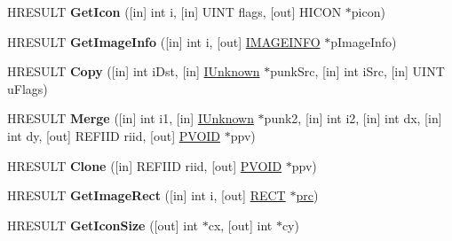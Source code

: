 \begin{DoxyCompactItemize}
\mbox{\label{interface_i_image_list_a5e71f99ba76698760c5931b771733073}} 
H\+R\+E\+S\+U\+LT {\bfseries Get\+Icon} (\mbox{[}in\mbox{]} int i, \mbox{[}in\mbox{]} U\+I\+NT flags, \mbox{[}out\mbox{]} H\+I\+C\+ON $\ast$picon)
\item 
\mbox{\label{interface_i_image_list_a140bde8c59e83504d3d712fb744539d2}} 
H\+R\+E\+S\+U\+LT {\bfseries Get\+Image\+Info} (\mbox{[}in\mbox{]} int i, \mbox{[}out\mbox{]} \hyperlink{struct_i_m_a_g_e_i_n_f_o}{I\+M\+A\+G\+E\+I\+N\+FO} $\ast$p\+Image\+Info)
\item 
\mbox{\label{interface_i_image_list_acbdf9c1b3f02a2cee373ad7ef3bd0c75}} 
H\+R\+E\+S\+U\+LT {\bfseries Copy} (\mbox{[}in\mbox{]} int i\+Dst, \mbox{[}in\mbox{]} \hyperlink{interface_i_unknown}{I\+Unknown} $\ast$punk\+Src, \mbox{[}in\mbox{]} int i\+Src, \mbox{[}in\mbox{]} U\+I\+NT u\+Flags)
\item 
\mbox{\label{interface_i_image_list_a9d8e77ca586e69487e75e3f8ee9d5eee}} 
H\+R\+E\+S\+U\+LT {\bfseries Merge} (\mbox{[}in\mbox{]} int i1, \mbox{[}in\mbox{]} \hyperlink{interface_i_unknown}{I\+Unknown} $\ast$punk2, \mbox{[}in\mbox{]} int i2, \mbox{[}in\mbox{]} int dx, \mbox{[}in\mbox{]} int dy, \mbox{[}out\mbox{]} R\+E\+F\+I\+ID riid, \mbox{[}out\mbox{]} \hyperlink{interfacevoid}{P\+V\+O\+ID} $\ast$ppv)
\item 
\mbox{\label{interface_i_image_list_a7a1b8b99808b0b64fc86c388019af362}} 
H\+R\+E\+S\+U\+LT {\bfseries Clone} (\mbox{[}in\mbox{]} R\+E\+F\+I\+ID riid, \mbox{[}out\mbox{]} \hyperlink{interfacevoid}{P\+V\+O\+ID} $\ast$ppv)
\item 
\mbox{\label{interface_i_image_list_a800d06a91e479fdc48140711c3414f35}} 
H\+R\+E\+S\+U\+LT {\bfseries Get\+Image\+Rect} (\mbox{[}in\mbox{]} int i, \mbox{[}out\mbox{]} \hyperlink{structtag_r_e_c_t}{R\+E\+CT} $\ast$\hyperlink{structtag_r_e_c_t}{prc})
\item 
\mbox{\label{interface_i_image_list_a758e272fafb08aeb7d8d7dd002e96cde}} 
H\+R\+E\+S\+U\+LT {\bfseries Get\+Icon\+Size} (\mbox{[}out\mbox{]} int $\ast$cx, \mbox{[}out\mbox{]} int $\ast$cy)
\item 

\end{DoxyCompactItemize}
